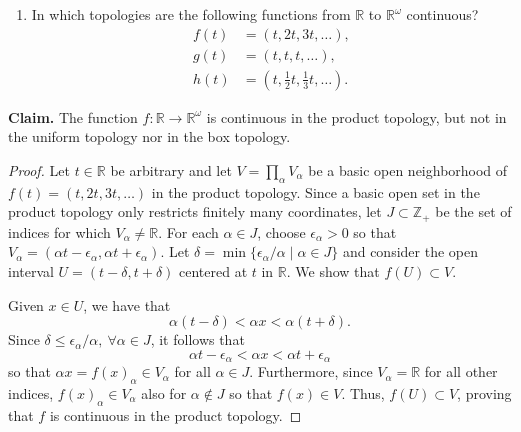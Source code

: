 \documentclass[a4paper,10pt]{article}
\newcommand{\ZZ}{\mathbb{Z}}
\newcommand{\RR}{\mathbb{R}}
\begin{document}
\begin{solution}
    \begin{enumerate}[label={(\alph*)}, align=left, leftmargin=\parindent, listparindent=\parindent, labelwidth=0pt, itemindent=!]
        \item In which topologies are the following functions from $\RR$ to $\RR^\omega$ continuous?
        \begin{align*}
            f(t) &= (t, 2t, 3t, \ldots), \\
            g(t) &= (t, t, t, \ldots), \\
            h(t) &= (t, \tfrac{1}{2} t, \tfrac{1}{3} t, \ldots).
        \end{align*}
    \end{enumerate}
    \textbf{Claim.} The function $f: \RR \rightarrow \RR^\omega$ is continuous in the product topology, but not in the uniform topology nor in the box topology.
    \begin{proof}
        Let $t \in \RR$ be arbitrary and let $V = \prod_\alpha V_\alpha$ be a basic open neighborhood of $f(t) = (t, 2t, 3t, \ldots)$ in the product topology.
        Since a basic open set in the product topology only restricts finitely many coordinates, let $J \subset \ZZ_+$ be the set of indices for which $V_\alpha \neq \RR$.
        For each $\alpha \in J$, choose $\epsilon_\alpha > 0$ so that $V_\alpha = (\alpha t - \epsilon_\alpha, \alpha t + \epsilon_\alpha)$.
        Let $\delta = \min\{\epsilon_\alpha / \alpha \mid \alpha \in J\}$ and consider the open interval $U = (t - \delta, t+ \delta)$ centered at $t$ in $\RR$.
        We show that $f(U) \subset V$.

        Given $x \in U$, we have that
        \begin{equation*}
            \alpha (t - \delta) < \alpha x < \alpha (t + \delta).
        \end{equation*}
        Since $\delta \leq \epsilon_{\alpha} / \alpha,~ \forall \alpha \in J$, it follows that
        \begin{equation*}
            \alpha t - \epsilon_\alpha < \alpha x < \alpha t + \epsilon_\alpha
        \end{equation*}
        so that $\alpha x = f(x)_\alpha \in V_\alpha$ for all $\alpha \in J$.
        Furthermore, since $V_\alpha = \RR$ for all other indices, $f(x)_\alpha \in V_\alpha$ also for $\alpha \notin J$ so that $f(x) \in V$.
        Thus, $f(U) \subset V$, proving that $f$ is continuous in the product topology.


\end{proof}
\end{solution}
\end{document}
